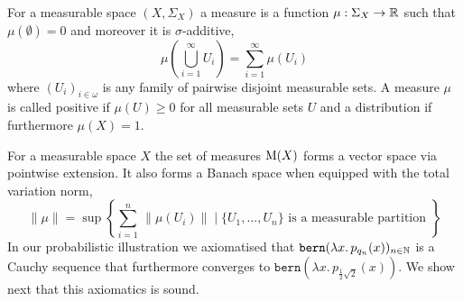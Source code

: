 \documentclass[a4paper,UKenglish,cleveref, autoref, thm-restate]{lipics-v2021}
\begin{document}
\begin{definition} For a measurable space $(X,\Sigma_X)$ a measure is a
        function $\mu : \Sigma_X \to \mathbb{R}$ such that $\mu(\emptyset) = 0$ and
        moreover it is $\sigma$-additive, \ie\ 
        \[
        \mu \left (\bigcup_{i =1}^{\infty} U_i \right ) = \sum_{i = 1}^{\infty}
        \mu(U_i) 
        \] 
where $(U_i)_{i \in \omega}$ is any family of pairwise disjoint measurable
sets.  A measure $\mu$ is called positive if $\mu(U) \geq 0$ for all measurable
sets $U$ and a distribution if furthermore $\mu(X) =1$.  
\end{definition}
For a measurable space $X$ the set of measures $\mathrm{M}(X)$ forms a vector space
via pointwise extension. It also forms a Banach space when equipped with the
total variation norm,
\[
        \lVert \mu \rVert = 
        \sup \left \{ \sum_{i = 1}^n \, \lVert \mu(U_i) \rVert \mid
             \{ U_1, \dots, U_n \} \text{ is a measurable partition }
        \right \}
\]
In our probabilistic illustration we axiomatised that $\mathtt{bern}(\lambda x.
\, p_{q_n}(x))_{n \in \mathbb{N}}$ is a Cauchy sequence that furthermore converges
to $\mathtt{bern}(\lambda x. \, p_{\frac{1}{2}\sqrt{2}}(x))$. We show next that
this axiomatics is sound.
\end{document}

